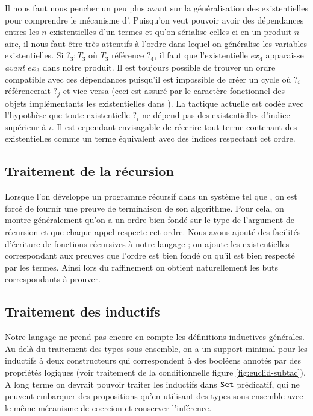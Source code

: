Il nous faut nous pencher un peu plus avant sur la g\'en\'eralisation des
existentielles pour comprendre le m\'ecanisme d'\eterm.
Puisqu'on veut pouvoir avoir des d\'ependances entres les $n$
existentielles d'un termes et qu'on s\'erialise celles-ci en un produit
$n$-aire, il nous faut \^etre tr\`es attentifs \`a l'ordre dans lequel on
g\'en\'eralise les variables existentielles. Si $?_3 : T_3$ o\`u $T_3$
r\'ef\'erence $?_4$, il faut que l'existentielle $ex_4$ apparaisse
\emph{avant} $ex_3$ dans notre produit. Il est toujours possible de
trouver un ordre compatible avec ces d\'ependances puisqu'il est
impossible de cr\'eer un cycle o\`u $?_i$ r\'ef\'erencerait $?_j$ et vice-versa
(ceci est assur\'e par le caract\`ere fonctionnel des objets impl\'ementants
les existentielles dans \Coq). La tactique actuelle est cod\'ee avec
l'hypoth\`ese que toute existentielle $?_i$ ne d\'epend pas des
existentielles d'indice sup\'erieur \`a $i$. Il est cependant envisagable de
r\'eecrire tout terme contenant des existentielles comme un terme
\'equivalent avec des indices respectant cet ordre.

\subsection{Traitement de la r\'ecursion}
Lorsque l'on d\'eveloppe un programme r\'ecursif dans un syst\`eme tel que
\Coq, on est forc\'e de fournir une preuve de terminaison de son
algorithme. Pour cela, on montre g\'en\'eralement qu'on a un ordre bien
fond\'e sur le type de l'argument de r\'ecursion et que chaque appel respecte
cet ordre. Nous avons ajout\'e des facilit\'es d'\'ecriture de fonctions
r\'ecursives \`a notre langage ; on ajoute les existentielles
correspondant aux preuves que l'ordre est bien fond\'e ou qu'il est bien
respect\'e par les termes. Ainsi lors du raffinement on obtient naturellement
les buts correspondants \`a prouver.

\subsection{Traitement des inductifs}
Notre langage ne prend pas encore en compte les d\'efinitions inductives g\'en\'erales.
Au-del\`a du traitement des types sous-ensemble, on a un support minimal
pour les inductifs \`a deux constructeurs qui correspondent \`a des bool\'eens
annot\'es par des propri\'et\'es logiques (voir traitement de la
conditionnelle figure \ref{fig:euclid-subtac}). A long terme on devrait
pouvoir traiter les inductifs dans $\text{\texttt{Set}}$ pr\'edicatif, qui ne peuvent 
embarquer des propositions qu'en utilisant des types sous-ensemble avec
le m\^eme m\'ecanisme de coercion et conserver l'inf\'erence.

